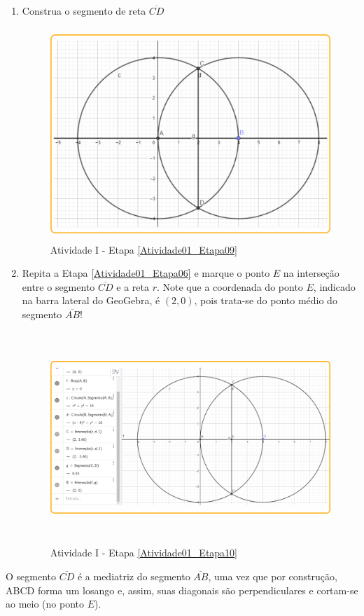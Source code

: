 \documentclass[11pt,a4paper]{article}
\begin{document}
\begin{enumerate}[{Etapa} 1.]
\item Construa o segmento de reta $\overline{CD}$ \label{Atividade01_Etapa09}
\begin{figure}[H]
    \centering
    \includegraphics[height=8cm]{Figuras/T01_Atividade01_Fig05.png}
    \caption{Atividade I - Etapa \ref{Atividade01_Etapa09}}
    \label{Atividade01_Etapa09_Imagem}
\end{figure}

\item Repita a Etapa \ref{Atividade01_Etapa06} e marque o ponto $E$ na interseção entre o segmento $\overline{CD}$ e a reta $r$. Note que a coordenada do ponto $E$, indicado na barra lateral do GeoGebra, é $(2,0)$, pois trata-se do ponto médio do segmento $\overline{AB}$! \label{Atividade01_Etapa10}

\begin{figure}[H]
    \centering
    \includegraphics[height=8cm]{Figuras/T01_Atividade01_Fig06.png}
    \caption{Atividade I - Etapa \ref{Atividade01_Etapa10}}
    \label{Atividade01_Etapa10_Imagem}
\end{figure}
\end{enumerate}
O segmento $\overline{CD}$ é a mediatriz do segmento $\overline{AB}$, uma vez que por construção, ABCD forma um losango e, assim, suas diagonais são perpendiculares e cortam-se ao meio (no ponto $E$).
\end{document}
